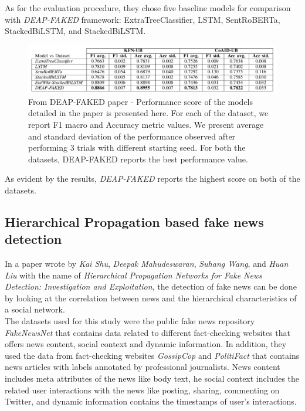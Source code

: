 \documentclass[10pt, english]{report}
\begin{document}
As for the evaluation procedure, they chose five baseline models for comparison with \textit{DEAP-FAKED} framework: ExtraTreeClassifier, LSTM, SentRoBERTa, StackedBiLSTM, and StackedBiLSTM.

\begin{figure}[H]
	\centering
	\includegraphics[scale=0.4]{img/deap_faked_evaluation.png}
	\caption{From DEAP-FAKED paper - Performance score of the models detailed in the paper is presented here. For each of the dataset, we report F1 macro and Accuracy metric values. We present average and standard deviation of the performance observed after performing 3 trials with different starting seed. For both the datasets, DEAP-FAKED reports the best performance value.}
\end{figure}

As evident by the results, \textit{DEAP-FAKED} reports the highest score on both of the datasets.


\subsection{Hierarchical Propagation based fake news detection \cite{shu2020hierarchical}}
In a paper wrote by \textit{Kai Shu}, \textit{Deepak Mahudeswaran}, \textit{Suhang Wang}, and \textit{Huan Liu} with the name of \textit{Hierarchical Propagation Networks for Fake News Detection: Investigation and Exploitation}, the detection of fake news can be done by looking at the correlation between news and the hierarchical characteristics of a social network.\\

The datasets used for this study were the public fake news repository \textit{FakeNewsNet} \cite{shu2018fakenewsnet} that contains data related to different fact-checking websites that offers news content, social context and dynamic information. In addition, they used the data from fact-checking websites \textit{GossipCop} and \textit{PolitiFact} that contains news articles with labels annotated by professional journalists. News content includes meta attributes of the news like body text, he social context includes the related user interactions with the news like posting, sharing, commenting on Twitter, and dynamic information contains the timestamps of user's interactions.\\
\end{document}
